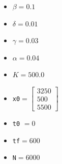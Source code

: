 \documentclass[12pt]{article}
\theoremstyle{saav}
\newcommand{\bk}{\bigskip}
\begin{document}
	
	\noindent
	\begin{minipage}[t]{0.3\textwidth}
	\begin{itemize}
		\item $\beta = 0.1$
		\item $\delta = 0.01$
		\item $\gamma = 0.03$
		\item $\alpha = 0.04$
		\item $K = 500.0$
	\end{itemize}
	\end{minipage}
	\hspace{0.01\textwidth}%
	\begin{minipage}[t]{0.3\textwidth}
		\begin{itemize}
			\item \texttt{x0}$= \begin{bmatrix}
				3250\\
				500\\
				5500
			\end{bmatrix}$
			\item \texttt{t0} $= 0$
			\item \texttt{tf}$=600$
			\item  \texttt{N}$=6000$
		\end{itemize}
	\end{minipage}
	\bk
	
\end{document}
